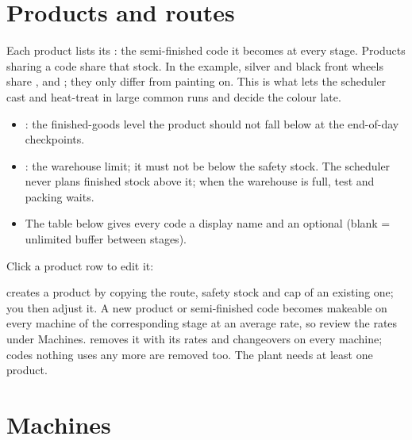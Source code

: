 \section{Products and routes}\label{sec:products}


Each product lists its : the semi-finished code it becomes at every stage. Products sharing a
code share that stock. In the example, silver and black front wheels share , 
and ; they only differ from painting on. This is what lets the scheduler cast and heat-treat
in large common runs and decide the colour late.

\begin{itemize}
  \item {}: the finished-goods level the product should not fall below at the end-of-day
        checkpoints.
  \item {}: the warehouse limit; it must not be below the safety stock. The scheduler never plans
        finished stock above it; when the warehouse is full, test and packing waits.
  \item The  table below gives every code a display name and an optional
         (blank = unlimited buffer between stages).
\end{itemize}

Click a product row to edit it:


 creates a product by copying the route, safety stock and cap of an existing one; you then
adjust it. A new product or semi-finished code becomes makeable on every machine of the corresponding stage
at an average rate, so review the rates under Machines.  removes it with its rates and
changeovers on every machine; codes nothing uses any more are removed too. The plant needs at least one
product.

\section{Machines}\label{sec:machines}


